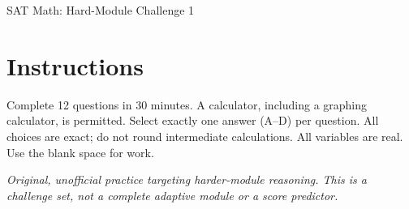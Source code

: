 \documentclass[12pt]{article}
\begin{document}
\begin{center}
  {\Large SAT Math: Hard-Module Challenge 1}
\end{center}

\section*{Instructions}
Complete 12 questions in 30 minutes. A calculator, including a graphing calculator, is permitted. Select exactly one answer (A--D) per question. All choices are exact; do not round intermediate calculations. All variables are real. Use the blank space for work.

\noindent\textit{Original, unofficial practice targeting harder-module reasoning. This is a challenge set, not a complete adaptive module or a score predictor.}
\end{document}
